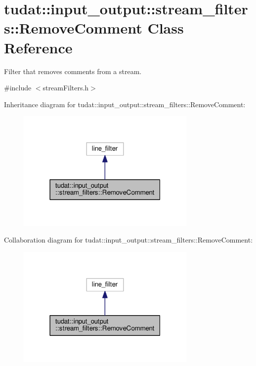 \hypertarget{classtudat_1_1input__output_1_1stream__filters_1_1RemoveComment}{}\section{tudat\+:\+:input\+\_\+output\+:\+:stream\+\_\+filters\+:\+:Remove\+Comment Class Reference}
\label{classtudat_1_1input__output_1_1stream__filters_1_1RemoveComment}


Filter that removes comments from a stream.  




{\ttfamily \#include $<$stream\+Filters.\+h$>$}



Inheritance diagram for tudat\+:\+:input\+\_\+output\+:\+:stream\+\_\+filters\+:\+:Remove\+Comment\+:
\nopagebreak
\begin{figure}[H]
\begin{center}
\leavevmode
\includegraphics[width=247pt]{classtudat_1_1input__output_1_1stream__filters_1_1RemoveComment__inherit__graph}
\end{center}
\end{figure}


Collaboration diagram for tudat\+:\+:input\+\_\+output\+:\+:stream\+\_\+filters\+:\+:Remove\+Comment\+:
\nopagebreak
\begin{figure}[H]
\begin{center}
\leavevmode
\includegraphics[width=247pt]{classtudat_1_1input__output_1_1stream__filters_1_1RemoveComment__coll__graph}
\end{center}
\end{figure}
